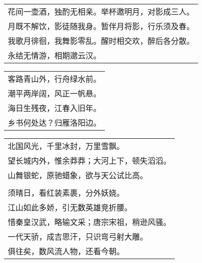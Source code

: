 \noindent\begin{minipage}{\linewidth}
  \vskip-3pt\begin{table}[H]
    \centering
    \begin{tabular}{@{}l@{}}
花间一壶酒，独酌无相亲。举杯邀明月，对影成三人。\\
月既不解饮，影徒随我身。暂伴月将影，行乐须及春。\\
我歌月徘徊，我舞影零乱。醒时相交欢，醉后各分散。\\
永结无情游，相期邈云汉。
    \end{tabular}
  \end{table}
\end{minipage}
\vspace{1cm}


\noindent\begin{minipage}{\linewidth}
  \vskip-3pt\begin{table}[H]
    \centering
    \begin{tabular}{@{}l@{}}
客路青山外，行舟绿水前。\\
潮平两岸阔，风正一帆悬。\\
海日生残夜，江春入旧年。\\
乡书何处达？归雁洛阳边。
    \end{tabular}
  \end{table}
\end{minipage}
\vspace{1cm}


\noindent\begin{minipage}{\linewidth}
  \vskip-3pt\begin{table}[H]
    \centering
    \begin{tabular}{@{}l@{}}
北国风光，千里冰封，万里雪飘。\\
望长城内外，惟余莽莽；大河上下，顿失滔滔。\\
山舞银蛇，原驰蜡象，欲与天公试比高。\\
\\
须晴日，看红装素裹，分外妖娆。\\
江山如此多娇，引无数英雄竞折腰。\\
惜秦皇汉武，略输文采；唐宗宋祖，稍逊风骚。\\
一代天骄，成吉思汗，只识弯弓射大雕。\\
俱往矣，数风流人物，还看今朝。
    \end{tabular}
  \end{table}
\end{minipage}
\vspace{1cm}


